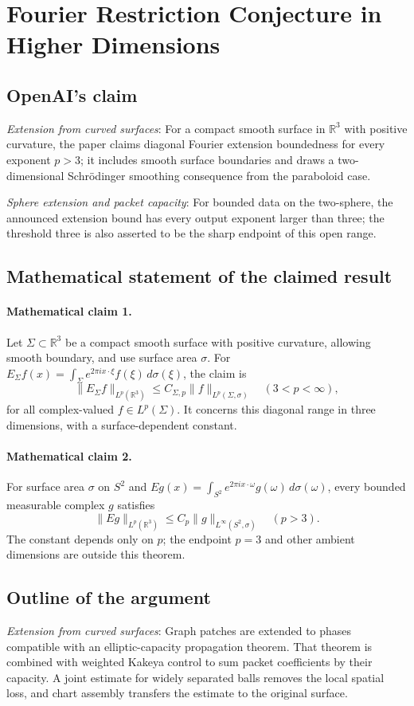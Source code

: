 \documentclass[11pt]{article}
\begin{document}
\section*{Fourier Restriction Conjecture in Higher Dimensions}

\subsection{OpenAI's claim}
\textit{Extension from curved surfaces}: For a compact smooth surface in $\mathbb R^3$ with positive curvature, the paper claims diagonal Fourier extension boundedness for every exponent $p>3$; it includes smooth surface boundaries and draws a two-dimensional Schrödinger smoothing consequence from the paraboloid case.

\textit{Sphere extension and packet capacity}: For bounded data on the two-sphere, the announced extension bound has every output exponent larger than three; the threshold three is also asserted to be the sharp endpoint of this open range.

\subsection{Mathematical statement of the claimed result}
\paragraph{Mathematical claim 1.} Let $\Sigma\subset\mathbb R^3$ be a compact smooth surface with positive curvature, allowing smooth boundary, and use surface area $\sigma$. For $E_\Sigma f(x)=\int_\Sigma e^{2\pi ix\cdot\xi}f(\xi)\,d\sigma(\xi)$, the claim is \[\|E_\Sigma f\|_{L^p(\mathbb R^3)}\le C_{\Sigma,p}\|f\|_{L^p(\Sigma,\sigma)}\quad(3<p<\infty),\] for all complex-valued $f\in L^p(\Sigma)$. It concerns this diagonal range in three dimensions, with a surface-dependent constant.

\paragraph{Mathematical claim 2.} For surface area $\sigma$ on $S^2$ and $Eg(x)=\int_{S^2}e^{2\pi ix\cdot\omega}g(\omega)\,d\sigma(\omega)$, every bounded measurable complex $g$ satisfies \[\|Eg\|_{L^p(\mathbb R^3)}\le C_p\|g\|_{L^\infty(S^2,\sigma)}\quad(p>3).\] The constant depends only on $p$; the endpoint $p=3$ and other ambient dimensions are outside this theorem.

\subsection{Outline of the argument}
\textit{Extension from curved surfaces}: Graph patches are extended to phases compatible with an elliptic-capacity propagation theorem. That theorem is combined with weighted Kakeya control to sum packet coefficients by their capacity. A joint estimate for widely separated balls removes the local spatial loss, and chart assembly transfers the estimate to the original surface.
\end{document}
